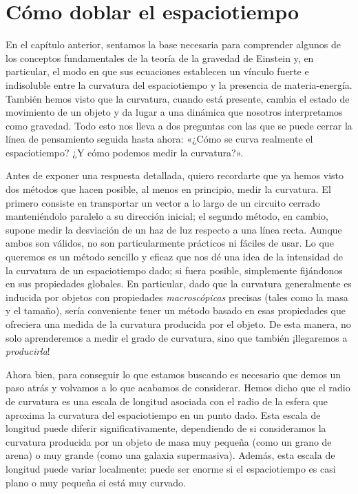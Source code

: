 \chapter{Cómo doblar el espaciotiempo}\label{ch:04}

En el capítulo anterior, sentamos la base necesaria para comprender algunos de los
conceptos fundamentales de la teoría de la gravedad de Einstein y, en particular, el
modo en que sus ecuaciones establecen un vínculo fuerte e indisoluble entre la
curvatura del espaciotiempo y la presencia de materia-energía. También hemos visto que
la curvatura, cuando está presente, cambia el estado de movimiento de un objeto y da
lugar a una dinámica que nosotros interpretamos como gravedad. Todo esto nos lleva a
dos preguntas con las que se puede cerrar la línea de pensamiento seguida hasta
ahora: «¿Cómo se curva realmente el espaciotiempo? ¿Y cómo podemos medir la curvatura?».

Antes de exponer una respuesta detallada, quiero recordarte que ya hemos visto dos
métodos que hacen posible, al menos en principio, medir la curvatura. El primero
consiste en transportar un vector a lo largo de un circuito cerrado
manteniéndolo paralelo a su dirección inicial; el segundo método, en cambio, supone
medir la desviación de un haz de luz respecto a una línea recta. Aunque ambos son
válidos, no son particularmente prácticos ni fáciles de usar. Lo que queremos es un
método sencillo y eficaz que nos dé una idea de la intensidad de la curvatura de un
espaciotiempo dado; si fuera posible, simplemente fijándonos en sus propiedades
globales. En particular, dado que la curvatura generalmente es inducida por objetos
con propiedades \emph{macroscópicas} precisas (tales como la masa y el tamaño), sería
conveniente tener un método basado en esas propiedades que ofreciera una medida de
la curvatura producida por el objeto. De esta manera, no solo aprenderemos a medir el
grado de curvatura, sino que también ¡llegaremos a \emph{producirla}!

Ahora bien, para conseguir lo que estamos buscando es necesario que demos un paso
atrás y volvamos a lo que acabamos de considerar. Hemos dicho que el radio de
curvatura es una escala de longitud asociada con el radio de la esfera que aproxima
la curvatura del espaciotiempo en un punto dado. Esta escala de longitud puede
diferir significativamente, dependiendo de si consideramos la curvatura producida
por un objeto de masa muy pequeña (como un grano de arena) o muy grande (como una
galaxia supermasiva). Además, esta escala de longitud puede variar localmente: puede
ser enorme si el espaciotiempo es casi plano o muy pequeña si está muy curvado.

